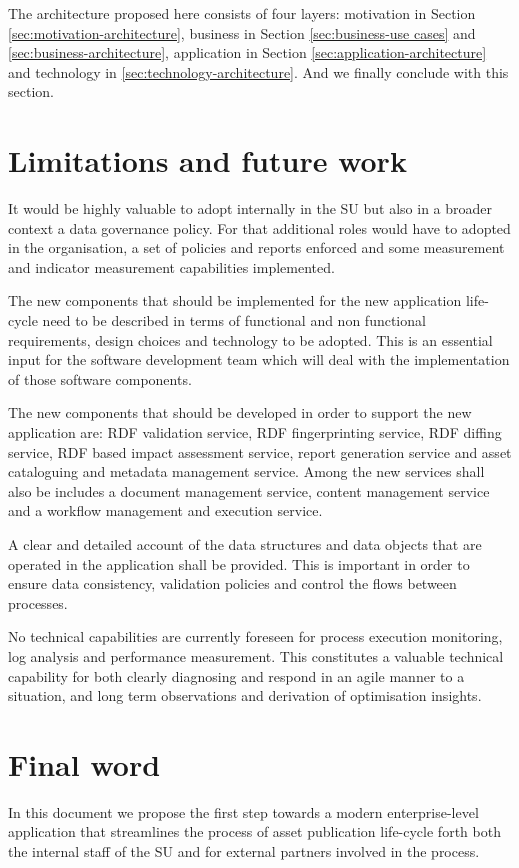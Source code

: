 	The architecture proposed here consists of four layers: motivation in Section \ref{sec:motivation-architecture}, business in Section \ref{sec:business-use cases} and \ref{sec:business-architecture}, application in Section \ref{sec:application-architecture} and technology in \ref{sec:technology-architecture}. And we finally conclude with this section.
	
	\section{Limitations and future work}
	
	It would be highly valuable to adopt internally in the SU but also in a broader context a data governance policy. For that additional roles would have to adopted in the organisation, a set of policies and reports enforced and some measurement and indicator measurement capabilities implemented. 
	
	The new components that should be implemented for the new application life-cycle need to be described in terms of functional and non functional requirements, design choices and technology to be adopted. This is an essential input for the software development team which will deal with the implementation of those software components. 
	
	The new components that should be developed in order to support the new application are: RDF validation service, RDF fingerprinting service, RDF diffing service, RDF based impact assessment service, report generation service and asset cataloguing and metadata management service. Among the new services shall also be includes a document management service, content management service and a workflow management and execution service. 
	
	A clear and detailed account of the data structures and data objects that are operated in the application shall be provided. This is important in order to ensure data consistency, validation policies and control the flows between processes. 
	
	No technical capabilities are currently foreseen for process execution monitoring, log analysis and performance measurement. This constitutes a valuable technical capability for both clearly diagnosing and respond in an agile manner to a situation, and long term observations and derivation of optimisation insights.
	
    \section{Final word}
    In this document we propose the first step towards a modern enterprise-level application that streamlines the process of asset publication life-cycle forth both the internal staff of the SU and for external partners involved in the process. 
    

